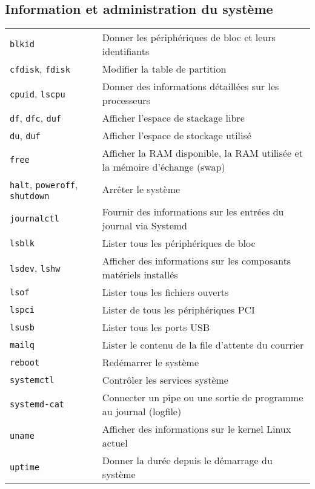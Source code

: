 \documentclass[10pt,a4paper]{article}
\begin{document}
\cheatsheet

\begin{multicols}{2}

\section{Information et administration du système}
\begin{tabular}{ p{2.5cm} p{8.5cm} }
  \hline
  \texttt{blkid} & Donner les périphériques de bloc et leurs identifiants\\
  \rowcolor{Gray}
  \texttt{cfdisk}, \texttt{fdisk} & Modifier la table de partition \\
  \texttt{cpuid}, \texttt{lscpu} & Donner des informations détaillées sur les processeurs \\
  \rowcolor{Gray}
  \texttt{df}, \texttt{dfc}, \texttt{duf} & Afficher l'espace de stackage libre \\
  \texttt{du}, \texttt{duf} & Afficher l'espace de stockage utilisé \\
  \rowcolor{Gray}
  \texttt{free} & Afficher la RAM disponible, la RAM utilisée et la mémoire d'échange (swap)\\
  \texttt{halt}, \texttt{poweroff}, \texttt{shutdown} & Arrêter le système\\
  \rowcolor{Gray}
  \texttt{journalctl} & Fournir des informations sur les entrées du journal via Systemd \\
  \texttt{lsblk} & Lister tous les périphériques de bloc\\
  \rowcolor{Gray}
  \texttt{lsdev}, \texttt{lshw} & Afficher des informations sur les composants matériels installés\\
  \texttt{lsof} & Lister tous les fichiers ouverts\\
  \rowcolor{Gray}
  \texttt{lspci} & Lister de tous les périphériques PCI\\
  \texttt{lsusb} & Lister tous les ports USB\\
  \rowcolor{Gray}
  \texttt{mailq} & Lister le contenu de la file d'attente du courrier\\
  \texttt{reboot} & Redémarrer le système\\
  \rowcolor{Gray}
  \texttt{systemctl} & Contrôler les services système \\
  \texttt{systemd-cat} & Connecter un pipe ou une sortie de programme au journal (logfile)\\
  \rowcolor{Gray}
  \texttt{uname} & Afficher des informations sur le kernel Linux actuel\\
  \texttt{uptime} & Donner la durée depuis le démarrage du système\\
  \hline
\end{tabular}


\end{multicols}
\end{document}
